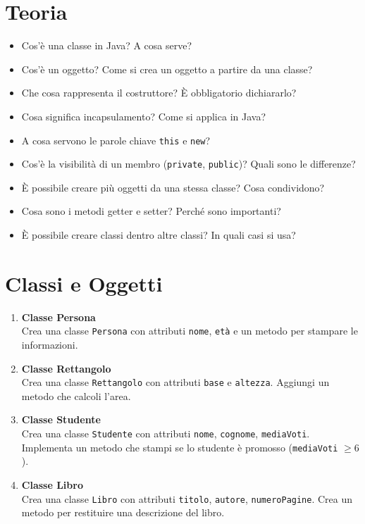 \documentclass{article}
\begin{document}
\section{Teoria}

\begin{itemize}
    \item Cos'è una classe in Java? A cosa serve?
    \item Cos'è un oggetto? Come si crea un oggetto a partire da una classe?
    \item Che cosa rappresenta il costruttore? È obbligatorio dichiararlo?
    \item Cosa significa incapsulamento? Come si applica in Java?
    \item A cosa servono le parole chiave \texttt{this} e \texttt{new}?
    \item Cos'è la visibilità di un membro (\texttt{private}, \texttt{public})? Quali sono le differenze?
    \item È possibile creare più oggetti da una stessa classe? Cosa condividono?
    \item Cosa sono i metodi getter e setter? Perché sono importanti?
    \item È possibile creare classi dentro altre classi? In quali casi si usa?
\end{itemize}

\section{Classi e Oggetti}

\begin{enumerate}
    \item \textbf{Classe Persona} \\
    Crea una classe \texttt{Persona} con attributi \texttt{nome}, \texttt{età} e un metodo per stampare le informazioni.

    \item \textbf{Classe Rettangolo} \\
    Crea una classe \texttt{Rettangolo} con attributi \texttt{base} e \texttt{altezza}. Aggiungi un metodo che calcoli l'area.

    \item \textbf{Classe Studente} \\
    Crea una classe \texttt{Studente} con attributi \texttt{nome}, \texttt{cognome}, \texttt{mediaVoti}. Implementa un metodo che stampi se lo studente è promosso (\texttt{mediaVoti} $\geq 6$).

    \item \textbf{Classe Libro} \\
    Crea una classe \texttt{Libro} con attributi \texttt{titolo}, \texttt{autore}, \texttt{numeroPagine}. Crea un metodo per restituire una descrizione del libro.

\end{enumerate}
\end{document}
